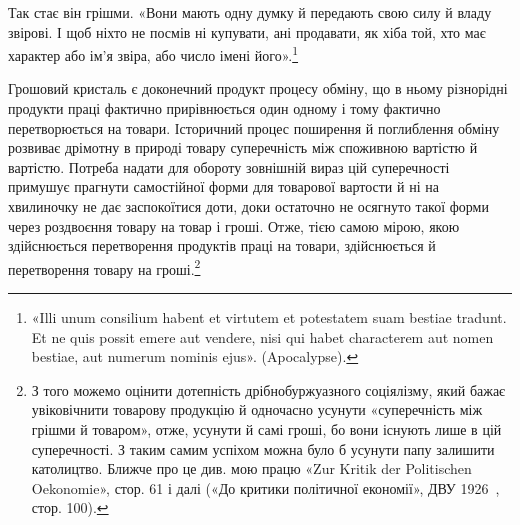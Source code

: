 \parcont{}  %
Так стає він грішми. «Вони мають одну думку й передають свою
силу й владу звірові. І щоб ніхто не посмів ні купувати, ані
продавати, як хіба той, хто має характер або ім’я звіра, або число
імені його».\footnote*{
«Illi unum consilium habent et virtutem et potestatem suam bestiae
tradunt. Et ne quis possit emere aut vendere, nisi qui habet characterem
aut nomen bestiae, aut numerum nominis ejus». (Apocalypse).
}

Грошовий кристаль є доконечний продукт процесу обміну,
що в ньому різнорідні продукти праці фактично прирівнюється
один одному і тому фактично перетворюється на товари. Історичний
процес поширення й поглиблення обміну розвиває дрімотну
в природі товару суперечність між споживною вартістю й вартістю.
Потреба надати для обороту зовнішній вираз цій суперечності
примушує прагнути самостійної форми для товарової вартости
й ні на хвилиночку не дає заспокоїтися доти, доки остаточно
не осягнуто такої форми через роздвоєння товару на товар і
гроші. Отже, тією самою мірою, якою здійснюється перетворення
продуктів праці на товари, здійснюється й перетворення товару
на гроші.\footnote{
З того можемо оцінити дотепність дрібнобуржуазного соціялізму,
який бажає увіковічнити товарову продукцію й одночасно усунути «суперечність
між грішми й товаром», отже, усунути й самі гроші, бо вони
існують лише в цій суперечності. З таким самим успіхом можна було б
усунути папу залишити католицтво. Ближче про це див. мою працю «Zur
Kritik der Politischen Oekonomie», стор. 61 і далі («До критики політичної
економії», ДВУ 1926~, стор. 100).
}

